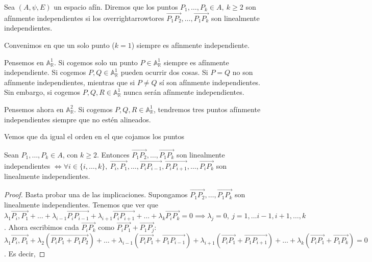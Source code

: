 \documentclass[14pt]{book}
\begin{document}
\begin{dfn}
	Sea $(A, \psi, E)$ un espacio afín. Diremos que los puntos $P_1, \dots, P_k \in A,\ k \geq 2$ son afínmente independientes si los overrightarrowtores $\overrightarrow{P_1 P_2}, \dots, \overrightarrow{P_1 P_k}$ son linealmente independientes.
	
	Convenimos en que un solo punto ($k = 1$) siempre es afínmente independiente.
\end{dfn}

\begin{ej}
	Pensemos en $\mathbb{A}^1_\mathbb{R}$. Si cogemos solo un punto $P \in \mathbb{A}^1_\mathbb{R}$ siempre es afínmente independiente. Si cogemos $P, Q \in \mathbb{A}^1_\mathbb{R}$ pueden ocurrir dos cosas. Si $P = Q$ no son afínmente independientes, mientras que si $P ≠ Q$ sí son afínmente independientes. Sin embargo, si cogemos $P, Q, R \in \mathbb{A}_\mathbb{R}^1$ nunca serán afínmente independientes.
	
	Pensemos ahora en $\mathbb{A}^2_\mathbb{R}$. Si cogemos $P, Q, R \in \mathbb{A}_\mathbb{R}^1$, tendremos tres puntos afínmente independientes siempre que no estén alineados.
	
	Vemos que da igual el orden en el que cojamos los puntos
\end{ej}

\begin{pro}
	Sean $P_1, \dots, P_k \in A$, con $k \geq 2$. Entonces $\overrightarrow{P_1 P_2}, \dots, \overrightarrow{P_1 P_k}$ son linealmente independientes $\iff \forall i \in \{i, \dots, k\},\ \overrightarrow{P_i,P_1}, \dots, \overrightarrow{P_i P_{i-1}}, \overrightarrow{P_iP_{i+1}}, \dots, \overrightarrow{P_iP_k}$ son linealmente independientes.
\end{pro}

\begin{proof}
	Basta probar una de las implicaciones. Supongamos $\overrightarrow{P_1 P_2}, \dots, \overrightarrow{P_1 P_k}$ son linealmente independientes. Tenemos que ver que $\lambda_1\overrightarrow{P_i,P_1} + \dots + \lambda_{i-1}\overrightarrow{P_i P_{i-1}} +  \lambda_{i+1}\overrightarrow{P_iP_{i+1}} + \dots + \lambda_k\overrightarrow{P_iP_k} = 0 \implies \lambda_j = 0,\ j = 1, \dots i-1, i+1, \dots, k$. Ahora escribimos cada $\overrightarrow{P_iP_k}$ como $\overrightarrow{P_iP_1} + \overrightarrow{P_1P_j}$: $\lambda_1\overrightarrow{P_i,P_1} + \lambda_2(\overrightarrow{P_iP_1 + P_1P_2}) + \dots + \lambda_{i-1}(\overrightarrow{P_i P_{1}} + \overrightarrow{P_1 P_{i-1}}) +  \lambda_{i+1}(\overrightarrow{P_i P_{1}} + \overrightarrow{P_1 P_{i+1}}) + \dots + \lambda_k(\overrightarrow{P_iP_1} + \overrightarrow{P_1 P_k}) = 0$. Es decir, %
\end{proof}
\end{document}
